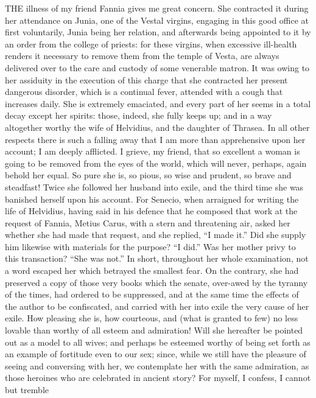 
THE illness of my friend Fannia gives me great concern. She contracted it
during her attendance on Junia, one of the Vestal virgins, engaging in
this good office at first voluntarily, Junia being her relation, and
afterwards being appointed to it by an order from the college of priests:
for these virgins, when excessive ill-health renders it necessary to
remove them from the temple of Vesta, are always delivered over to the
care and custody of some venerable matron. It was owing to her assiduity
in the execution of this charge that she contracted her present dangerous
disorder, which is a continual fever, attended with a cough that increases
daily. She is extremely emaciated, and every part of her seems in a total
decay except her spirits: those, indeed, she fully keeps up; and in a way
altogether worthy the wife of Helvidius, and the daughter of Thrasea. In
all other respects there is such a falling away that I am more than
apprehensive upon her account; I am deeply afflicted. I grieve, my friend,
that so excellent a woman is going to be removed from the eyes of the
world, which will never, perhaps, again behold her equal. So pure she is,
so pious, so wise and prudent, so brave and steadfast! Twice she followed
her husband into exile, and the third time she was banished herself upon
his account. For Senecio, when arraigned for writing the life of
Helvidius, having said in his defence that he composed that work at the
request of Fannia, Metius Carus, with a stern and threatening air, asked
her whether she had made that request, and she replied, ``I made it.'' Did
she supply him likewise with materials for the purpose? ``I did.'' Was her
mother privy to this transaction? ``She was not.'' In short, throughout her
whole examination, not a word escaped her which betrayed the smallest
fear. On the contrary, she had preserved a copy of those very books which
the senate, over-awed by the tyranny of the times, had ordered to be
suppressed, and at the same time the effects of the author to be
confiscated, and carried with her into exile the very cause of her exile.
How pleasing she is, how courteous, and (what is granted to few) no less
lovable than worthy of all esteem and admiration! Will she hereafter be
pointed out as a model to all wives; and perhaps be esteemed worthy of
being set forth as an example of fortitude even to our sex; since, while
we still have the pleasure of seeing and conversing with her, we
contemplate her with the same admiration, as those heroines who are
celebrated in ancient story? For myself, I confess, I cannot but tremble
